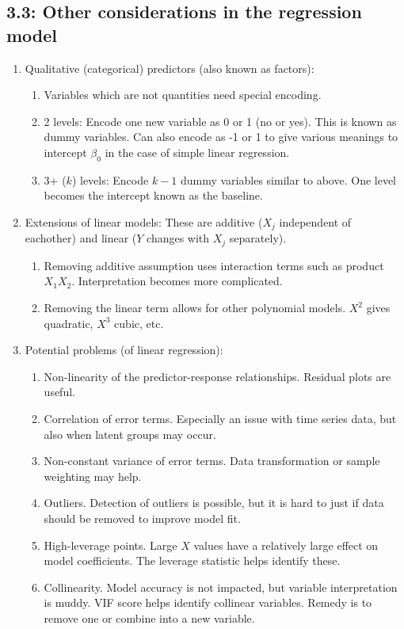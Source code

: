 \documentclass{article}
\begin{document}
\subsection*{3.3: Other considerations in the regression model}

\begin{enumerate}
\item Qualitative (categorical) predictors (also known as factors):
\begin{enumerate}
\item Variables which are not quantities need special encoding.
\item 2 levels: Encode one new variable as 0 or 1 (no or yes). This is known as dummy variables. Can also encode as -1 or 1 to give various meanings to intercept $\beta_0$ in the case of simple linear regression.
\item 3+ ($k$) levels: Encode $k-1$ dummy variables similar to above. One level becomes the intercept known as the baseline.
\end{enumerate}

\item Extensions of linear models: These are additive ($X_j$ independent of eachother) and linear ($Y$ changes with $X_j$ separately).
\begin{enumerate}
\item Removing additive assumption uses interaction terms such as product $X_1 X_2$. Interpretation becomes more complicated.
\item Removing the linear term allows for other polynomial models. $X^2$ gives quadratic, $X^3$ cubic, etc.
\end{enumerate}

\item Potential problems (of linear regression):
\begin{enumerate}
\item Non-linearity of the predictor-response relationships. Residual plots are useful.
\item Correlation of error terms. Especially an issue with time series data, but also when latent groups may occur.
\item Non-constant variance of error terms. Data transformation or sample weighting may help.
\item Outliers. Detection of outliers is possible, but it is hard to just if data should be removed to improve model fit.
\item High-leverage points. Large $X$ values have a relatively large effect on model coefficients. The leverage statistic helps identify these.
\item Collinearity. Model accuracy is not impacted, but variable interpretation is muddy. VIF score helps identify collinear variables. Remedy is to remove one or combine into a new variable.
\end{enumerate}
\end{enumerate}
\end{document}
